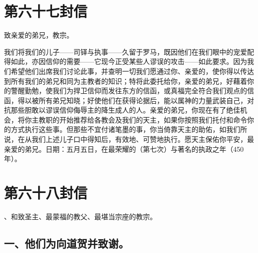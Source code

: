 
\section{第六十七封信}

致亲爱的弟兄，教宗。\par

我们将我们的儿子——司铎与执事——久留于罗马，既因他们在我们眼中的宠爱配得如此，亦因信仰的需要——它现今正受某些人谬误的攻击——如此要求。因为我们希望他们出席我们讨论此事，并查明一切我们愿通过你、亲爱的，使你得以传达到所有我们的弟兄和同为主教者的知识；特将此委托给你，亲爱的弟兄，好藉着你的警醒勤勉，使我们为捍卫信仰而发往东方的信函，或真福完全符合我们观点的信函，得以被所有弟兄知晓；好使他们在获得论据后，能以属神的力量武装自己，对抗那些胆敢以谬误信仰侮辱主的降生成人的人。亲爱的弟兄，你现在有了绝佳机会，将你主教职的开始推荐给各教会及我们的天主，如果你按照我们托付和命令你的方式执行这些事。但那些不宜付诸笔墨的事，你当倚靠天主的助佑，如我们所说，在从我们上述儿子口中得知后，有效地、可赞地执行。愿天主保佑你平安，最亲爱的弟兄。日期：五月五日，在最荣耀的（第七次）与著名的执政之年（450年）。\par



\section{第六十八封信}

\par

、和致圣主、最蒙福的教父、最堪当宗座的教宗。\par


\subsection{一、他们为向道贺并致谢。}

